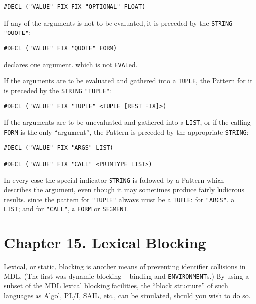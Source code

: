 \documentclass[a4paper,]{article}
\begin{document}
\begin{verbatim}
#DECL ("VALUE" FIX FIX "OPTIONAL" FLOAT)
\end{verbatim}

If any of the arguments is not to be evaluated, it is preceded by the \texttt{STRING} \texttt{"QUOTE"}:

\begin{verbatim}
#DECL ("VALUE" FIX "QUOTE" FORM)
\end{verbatim}

declares one argument, which is not \texttt{EVAL}ed.

If the arguments are to be evaluated and gathered into a \texttt{TUPLE},  the Pattern for it is
preceded by the \texttt{STRING} \texttt{"TUPLE"}:

\begin{verbatim}
#DECL ("VALUE" FIX "TUPLE" <TUPLE [REST FIX]>)
\end{verbatim}

If the arguments are to be unevaluated and gathered into a \texttt{LIST}, or if the calling \texttt{FORM} is the only
``argument'', the Pattern is preceded by the appropriate \texttt{STRING}:

\begin{verbatim}
#DECL ("VALUE" FIX "ARGS" LIST)

#DECL ("VALUE" FIX "CALL" <PRIMTYPE LIST>)
\end{verbatim}

In every case the special indicator \texttt{STRING} is followed by a Pattern which describes the argument, even though it
may sometimes produce fairly ludicrous results, since the pattern for \texttt{"TUPLE"} always must be a \texttt{TUPLE}; for
\texttt{"ARGS"}, a \texttt{LIST}; and for \texttt{"CALL"}, a \texttt{FORM} or \texttt{SEGMENT}.

\section{Chapter 15. Lexical Blocking}\label{chapter-15.-lexical-blocking}

Lexical, or static, blocking is another means of preventing identifier collisions in MDL. (The first was dynamic blocking
-- binding and \texttt{ENVIRONMENT}s.) By using a subset of the MDL lexical blocking facilities, the ``block structure'' of
such languages as Algol, PL/I, SAIL, etc., can be simulated, should you wish to do so.
\end{document}
